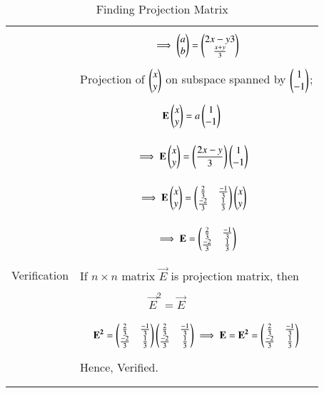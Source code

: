\documentclass[journal,12pt]{IEEEtran}
\begin{document}
\begin{longtable}{|p{4cm}|p{14cm}|}
       
       &
       {\begin{align}
       \implies \begin{pmatrix}a\\b\end{pmatrix} = \begin{pmatrix}{2x-y}{3}\\\frac{x+y}{3}\end{pmatrix}
       \end{align}}\\
       
     & Projection of $\begin{pmatrix}x\\y\end{pmatrix}$ on subspace spanned by $\begin{pmatrix}1\\-1\end{pmatrix}$;\\
     
     
     &
     {\begin{align}
     & \mathbf{E}\begin{pmatrix}x\\y\end{pmatrix} = a\begin{pmatrix}1\\-1\end{pmatrix}
     \end{align}}\\
     
     
     &{\begin{align}
     & \implies\mathbf{E}\begin{pmatrix}x\\y\end{pmatrix} = \left(\frac{2x-y}{3}\right)\begin{pmatrix}1\\-1\end{pmatrix}
     \end{align}}\\
     
     
     &{\begin{align}
     & \implies\mathbf{E}\begin{pmatrix}x\\y\end{pmatrix} = \begin{pmatrix}\frac{2}{3}&\frac{-1}{3}\\\frac{-2}{3}& \frac{1}{3}\end{pmatrix}\begin{pmatrix}x\\y\end{pmatrix}
     \end{align}}\\
     
     
     &{\begin{align}
     \implies \mathbf{E}=\begin{pmatrix}\frac{2}{3}&\frac{-1}{3}\\\frac{-2}{3}& \frac{1}{3}\end{pmatrix}
     \end{align}}\\
     
     
\hline
\multirow{3}{*}{Verification} & \\

 
     & If $n\times n$ matrix $\vec{E}$ is projection matrix, then\\
     &\\
	 &$\qquad\qquad\qquad \vec{E}^2=\vec{E}$\\
     &\\
	
	
     &{\begin{align}
     \mathbf{E^{2}} = \begin{pmatrix}\frac{2}{3}&\frac{-1}{3}\\\frac{-2}{3}& \frac{1}{3}\end{pmatrix}\begin{pmatrix}\frac{2}{3}&\frac{-1}{3}\\\frac{-2}{3}& \frac{1}{3}\end{pmatrix}
     \implies \mathbf{E}=\mathbf{E^{2}}=\begin{pmatrix}\frac{2}{3}&\frac{-1}{3}\\\frac{-2}{3}& \frac{1}{3}\end{pmatrix}
     \end{align}}\\
  & Hence, Verified.\\
  &\\
\hline
\caption{Finding Projection Matrix}
\label{table:1}
\end{longtable}
\end{document}
